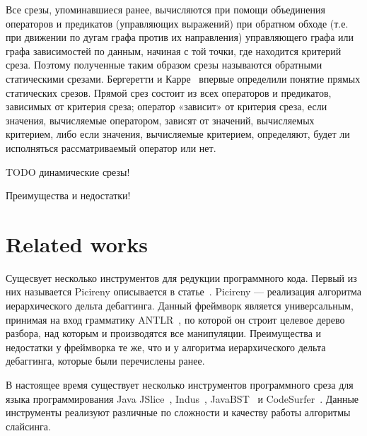 Все срезы, упоминавшиеся ранее, вычисляются при помощи объединения операторов и предикатов (управляющих выражений) при обратном обходе (т.е. при движении по дугам графа против их направления) управляющего графа или графа зависимостей по данным, начиная с той точки, где находится критерий среза. Поэтому полученные таким образом срезы называются обратными статическими срезами.   Бергеретти и Карре~\cite{bergeretti1985information} впервые определили понятие прямых статических срезов. Прямой срез состоит из всех операторов и предикатов, зависимых от критерия среза; оператор «зависит» от критерия среза, если значения, вычисляемые оператором, зависят от значений, вычисляемых критерием, либо если значения, вычисляемые критерием, определяют, будет ли исполняться рассматриваемый оператор или нет. 

TODO динамические срезы!

Преимущества и недостатки!

\section{Related works}
Сущесвует несколько инструментов для редукции программного кода. Первый из них называется Picireny описывается в статье~\cite{hodovan2017tree}. Picireny --- реализация алгоритма иерархического дельта дебаггинга. Данный фреймворк является универсальным, принимая на вход грамматику ANTLR~\cite{parr2013definitive}, по которой он строит целевое дерево разбора, над которым и производятся все манипуляции. Преимущества и недостатки у фреймворка те же, что и у алгоритма иерархического дельта дебаггинга, которые были перечислены ранее. 

В настоящее время существует несколько инструментов программного среза для языка программирования Java JSlice~\cite{WR:04}, Indus~\cite{jayaraman2005kaveri}, JavaBST~\cite{abdallah2017javabst} и CodeSurfer~\cite{anderson2004codesurfer}. Данные инструменты реализуют различные по сложности и качеству работы алгоритмы слайсинга.


